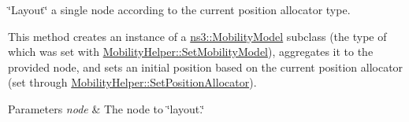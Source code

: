\char`\"{}\+Layout\char`\"{} a single node according to the current position allocator type. 

This method creates an instance of a \hyperlink{classns3_1_1MobilityModel}{ns3\+::\+Mobility\+Model} subclass (the type of which was set with \hyperlink{classns3_1_1MobilityHelper_a030275011b6f40682e70534d30280aba}{Mobility\+Helper\+::\+Set\+Mobility\+Model}), aggregates it to the provided node, and sets an initial position based on the current position allocator (set through \hyperlink{classns3_1_1MobilityHelper_ac59d5295076be3cc11021566713a28c5}{Mobility\+Helper\+::\+Set\+Position\+Allocator}).


\begin{DoxyParams}{Parameters}
{\em node} & The node to \char`\"{}layout.\char`\"{} \\
\hline
\end{DoxyParams}

